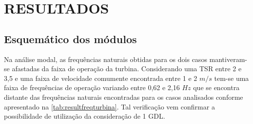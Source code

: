 
\chapter{RESULTADOS}
\label{chap:resultados}


\section{Esquemático dos módulos}
\label{sec:resultmodal}

Na análise modal, as frequências naturais obtidas para os dois casos mantiveram-se afastadas da faixa de operação da turbina. Considerando uma TSR entre 2 e 3,5 e uma faixa de velocidade comumente encontrada entre 1 e 2 $m/s$ tem-se uma faixa de frequências de operação variando entre 0,62 e 2,16 $Hz$ que se encontra distante das frequências naturais encontradas para os casos analisados conforme apresentado na \autoref{tab:resultfreqturbina}. Tal verificação vem confirmar a possibilidade de utilização da consideração de 1 GDL. 
